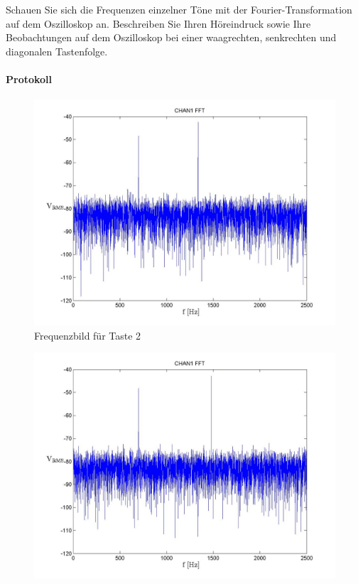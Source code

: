 \documentclass[10pt]{scrreprt}
\begin{document}
        Schauen Sie sich die Frequenzen einzelner Töne mit der Fourier-Transformation auf dem
        Oszilloskop an. Beschreiben Sie Ihren Höreindruck sowie Ihre Beobachtungen auf dem
        Oszilloskop bei einer waagrechten, senkrechten und diagonalen Tastenfolge.
        \paragraph{Protokoll}
        \begin{center}
            \begin{figure}[H]
                \includegraphics[width=\textwidth]{Screenshot_GUI_431_T2_chan1_fft.jpg}
                \caption{Frequenzbild für Taste 2}
            \end{figure}
            \begin{figure}[H]
                \includegraphics[width=\textwidth]{Screenshot_GUI_431_T3_chan1_fft.jpg}

\end{figure}
\end{center}
\end{document}
